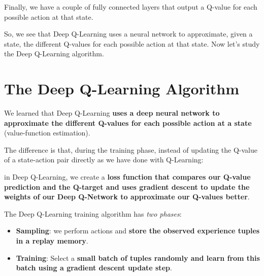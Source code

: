 \documentclass[11pt,a4paper]{article}
\begin{document}
Finally, we have a couple of fully connected layers that output a Q-value for each possible action at that state.


So, we see that Deep Q-Learning uses a neural network to approximate, given a state, the different Q-values for each possible action at that state. Now let's study the Deep Q-Learning algorithm.

\section{The Deep Q-Learning Algorithm}\label{the-deep-q-learning-algorithm}

We learned that Deep Q-Learning \textbf{uses a deep neural network to approximate the different Q-values for each possible action at a state} (value-function estimation).

The difference is that, during the training phase, instead of updating the Q-value of a state-action pair directly as we have done with Q-Learning:


in Deep Q-Learning, we create a \textbf{loss function that compares our Q-value prediction and the Q-target and uses gradient descent to update the weights of our Deep Q-Network to approximate our Q-values better}.


The Deep Q-Learning training algorithm has \emph{two phases}:

\begin{itemize}
\tightlist
\item
  \textbf{Sampling}: we perform actions and \textbf{store the observed experience tuples in a replay memory}.
\item
  \textbf{Training}: Select a \textbf{small batch of tuples randomly and learn from this batch using a gradient descent update step}.
\end{itemize}
\end{document}
